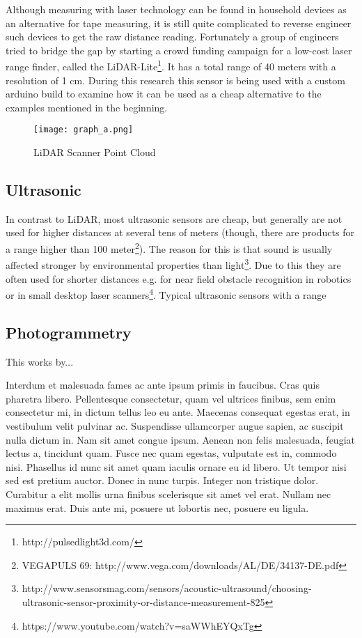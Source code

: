 Although measuring with laser technology can be found in household devices as an alternative for tape measuring, it is still quite complicated to reverse engineer such devices to get the raw distance reading. Fortunately a group of engineers tried to bridge the gap by starting a crowd funding campaign for a low-cost laser range finder, called the LiDAR-Lite\footnote{http://pulsedlight3d.com/}. It has a total range of 40 meters with a resolution of 1 cm. During this research this sensor is being used with a custom arduino build to examine how it can be used as a cheap alternative to the examples mentioned in the beginning.

\begin{figure}[h]
	\centering
	\texttt{[image: graph\_a.png]}
	\caption{LiDAR Scanner Point Cloud}
	\label{fig:LiDAR}
\end{figure}

\subsection{Ultrasonic}

In contrast to LiDAR, most ultrasonic sensors are cheap, but generally are not used for higher distances at several tens of meters (though, there are products for a range higher than 100 meter\footnote{VEGAPULS 69: http://www.vega.com/downloads/AL/DE/34137-DE.pdf}). The reason for this is that sound is usually affected stronger by environmental properties than light\footnote{http://www.sensorsmag.com/sensors/acoustic-ultrasound/choosing-ultrasonic-sensor-proximity-or-distance-measurement-825}. Due to this they are often used for shorter distances e.g. for near field obstacle recognition in robotics or in small desktop laser scanners\footnote{https://www.youtube.com/watch?v=saWWhEYQxTg}. Typical ultrasonic sensors with a range 



\subsection{Photogrammetry}

This works by...

Interdum et malesuada fames ac ante ipsum primis in faucibus. Cras quis pharetra libero. Pellentesque consectetur, quam vel ultrices finibus, sem enim consectetur mi, in dictum tellus leo eu ante. Maecenas consequat egestas erat, in vestibulum velit pulvinar ac. Suspendisse ullamcorper augue sapien, ac suscipit nulla dictum in. Nam sit amet congue ipsum. Aenean non felis malesuada, feugiat lectus a, tincidunt quam. Fusce nec quam egestas, vulputate est in, commodo nisi. Phasellus id nunc sit amet quam iaculis ornare eu id libero. Ut tempor nisi sed est pretium auctor. Donec in nunc turpis. Integer non tristique dolor. Curabitur a elit mollis urna finibus scelerisque sit amet vel erat. Nullam nec maximus erat. Duis ante mi, posuere ut lobortis nec, posuere eu ligula.

